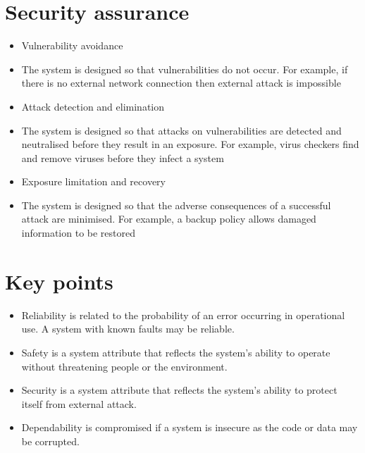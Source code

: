 \section{Security assurance}
\begin{itemize}
\item Vulnerability avoidance

  \item The system is designed so that vulnerabilities do not occur. For example, if there is no external network connection then external attack is impossible

\item Attack detection and elimination

  \item The system is designed so that attacks on vulnerabilities are detected and neutralised before they result in an exposure. For example, virus checkers find and remove viruses before they infect a system

\item Exposure limitation and recovery

  \item The system is designed so that the adverse consequences of a successful attack are minimised. For example, a backup policy allows damaged information to be restored
\end{itemize}
\section{Key points}
\begin{itemize}
\item Reliability is related to the probability of an error occurring in operational use. A system with known faults may be reliable.

\item Safety is a system attribute that reflects the system’s ability to operate without threatening people or the environment.

\item Security is a system attribute that reflects the system’s ability to protect itself from external attack.

\item Dependability is compromised if a system is insecure as the code or data may be corrupted.
\end{itemize}
